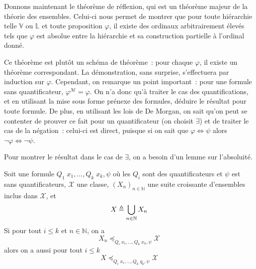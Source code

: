 Donnons maintenant le théorème de réflexion, qui est un théorème majeur de la
théorie des ensembles. Celui-ci nous permet de montrer que pour toute hiérarchie
telle $\mathbb V$ ou $\mathbb L$ et toute proposition $\varphi$, il existe des
ordinaux arbitrairement élevés tels que $\varphi$ est absolue entre la
hiérarchie et sa construction partielle à l'ordinal donné.

Ce théorème est plutôt un schéma de théorème~: pour chaque $\varphi$, il existe
un théorème correspondant. La démonstration, sans surprise, s'effectuera par
induction sur $\varphi$. Cependant, on remarque un point important~: pour une
formule sans quantificateur, $\varphi^\mathcal M = \varphi$. On n'a donc qu'à
traiter le cas des quantifications, et en utilisant la mise sous forme prénexe
des formules, déduire le résultat pour toute formule. De plus, en utilisant les
lois de De Morgan, on sait qu'on peut se contenter de prouver ce fait pour un
quantificateur (on choisit $\exists$) et de traiter le cas de la négation~:
celui-ci est direct, puisque si on sait que $\varphi \iff \psi$ alors
$\lnot\varphi \iff \lnot \psi$.

Pour montrer le résultat dans le cas de $\exists$, on a besoin d'un lemme sur
l'absoluité.

\begin{lemma}\label{lem.refl1}
  Soit une formule $Q_1\; x_1,\ldots,Q_k\;x_k, \psi$ où les $Q_i$ sont des
  quantificateurs et $\psi$ est sans quantificateurs, $\mathcal X$ une classe,
  $(X_n)_{n\in \mathbb N}$ une suite croissante d'ensembles inclus dans
  $\mathcal X$, et
  \[X \triangleq \bigcup_{n \in \mathbb N} X_n\]
  Si pour tout $i \leq k$ et $n \in \mathbb N$, on a
  \[X_n \preccurlyeq_{Q_i\;x_i,\ldots, Q_k\;x_k,\psi} \mathcal X\]
  alors on a aussi pour tout $i \leq k$
  \[X \preccurlyeq_{Q_i\; x_i,\ldots, Q_k\;q_k, \psi}\mathcal X\]
\end{lemma}

